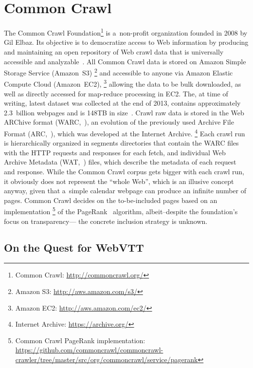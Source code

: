 \documentclass{sig-alternate}
\newcommand{\inlinelistingsize}{\fontsize{8pt}{11pt}}
\let\oldurl\url
\renewcommand{\url}[1]{\inlinelistingsize\oldurl{#1}}
\begin{document}
\section{Common Crawl}

The Common Crawl Foundation\footnote{Common Crawl: \url{http://commoncrawl.org/}}
is a~non-profit organization founded in 2008 by Gil Elbaz.
Its objective is to democratize access to Web information
by producing and maintaining an open repository of Web crawl data
that is universally accessible and analyzable~\cite{simonite2013commoncrawl}.
All Common Crawl data is stored on Amazon Simple Storage Service (Amazon~S3)%
\footnote{Amazon S3: \url{http://aws.amazon.com/s3/}} and
accessible to anyone via Amazon Elastic Compute Cloud (Amazon~EC2),%
\footnote{Amazon EC2: \url{http://aws.amazon.com/ec2/}}
allowing the data to be bulk downloaded,
as well as directly accessed for map-reduce processing in EC2.
The, at time of writing, latest dataset was collected at the end of 2013,
contains approximately 2.3~billion webpages and is 148TB in size~\cite{green2014winter}.
Crawl raw data is stored in the Web ARChive format
(WARC,~\cite{iso285002008warc}), an evolution of the previously used
Archive File Format (ARC,~\cite{burner1996arc}),
which was developed at the Internet Archive.%
\footnote{Internet Archive: \url{https://archive.org/}}
Each crawl run is hierarchically organized in segments directories
that contain the WARC files with the HTTP requests and responses for each fetch,
and individual Web Archive Metadata (WAT,~\cite{goel2011wat}) files,
which describe the metadata of each request and response.
While the Common Crawl corpus gets bigger with each crawl run,
it obviously does not represent the ``whole Web'',
which is an illusive concept anyway,
given that a~simple calendar webpage can produce an infinite number of pages.
Common Crawl decides on the to-be-included pages based on an implementation%
\footnote{Common Crawl PageRank implementation:
\url{https://github.com/commoncrawl/commoncrawl-crawler/tree/master/src/org/commoncrawl/service/pagerank}}
of the PageRank~\cite{page1999pagerank} algorithm,
albeit--despite the foundation's focus on transparency---%
the concrete inclusion strategy is unknown.

\subsection{On the Quest for WebVTT}
\end{document}
